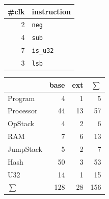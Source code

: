 \documentclass{article}
\begin{document}
\begin{minipage}[t][0.6\textheight][s]{0.3\textwidth}
    \vfill
    \begin{tabular}{rl}
        \toprule
        \#clk & instruction      \\ \midrule
            2 & \texttt{neg}     \\
            4 & \texttt{sub}     \\
            7 & \texttt{is\_u32} \\
            3 & \texttt{lsb}     \\ \bottomrule
    \end{tabular}
    \vspace*{3em}

    \begin{tabular}{lrrr}
        \toprule
                    & base & ext & $\sum$ \\ \midrule
        Program     &    4 &   1 &      5 \\
        Processor   &   44 &  13 &     57 \\
        OpStack     &    4 &   2 &      6 \\
        RAM         &    7 &   6 &     13 \\
        JumpStack   &    5 &   2 &      7 \\
        Hash        &   50 &   3 &     53 \\
        U32         &   14 &   1 &     15 \\ \bottomrule\bottomrule
        $\sum$      &  128 &  28 &    156
    \end{tabular}
\end{minipage}%
\hfill%
\end{document}
